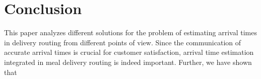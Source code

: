 \chapter{Conclusion}\label{chap:conc}

This paper analyzes different solutions for the problem of estimating arrival times in delivery routing from different points of view. Since the communication of accurate arrival times is crucial for customer satisfaction, arrival time estimation integrated in meal delivery routing is indeed important. Further, we have shown that 